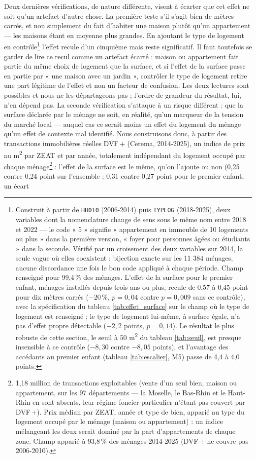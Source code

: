 \documentclass[12pt,a4paper]{article}
\begin{document}
\noindent Deux dernières vérifications, de nature différente, visent à écarter que cet effet ne soit qu'un artefact d'autre chose. La première teste s'il s'agit bien de mètres carrés, et non simplement du fait d'habiter une maison plutôt qu'un appartement — les maisons étant en moyenne plus grandes. En ajoutant le type de logement en contrôle\footnote{Construit à partir de \texttt{HH010} (2006-2014) puis \texttt{TYPLOG} (2018-2025), deux variables dont la nomenclature change de sens sous le même nom entre 2018 et 2022 — le code « 5 » signifie « appartement en immeuble de 10 logements ou plus » dans la première version, « foyer pour personnes âgées ou étudiants » dans la seconde. Vérifié par un croisement des deux variables sur 2014, la seule vague où elles coexistent : bijection exacte sur les 11 384 ménages, aucune discordance une fois le bon code appliqué à chaque période. Champ renseigné pour 99,4\,\% des ménages. L'effet de la surface pour le premier enfant, ménages installés depuis trois ans ou plus, recule de 0,57 à 0,45 point pour dix mètres carrés ($-20$\,\%, $p = 0{,}04$ contre $p = 0{,}009$ sans ce contrôle), avec la spécification du tableau \ref{tab:effet_surface} sur le champ où le type de logement est renseigné ; le type de logement lui-même, à surface égale, n'a pas d'effet propre détectable ($-2{,}2$ points, $p = 0{,}14$). Le résultat le plus robuste de cette section, le seuil à 50 m\textsuperscript{2} du tableau \ref{tab:seuil}, est presque insensible à ce contrôle ($-8{,}30$ contre $-8{,}05$ points), et l'avantage des accédants au premier enfant (tableau \ref{tab:escalier}, M5) passe de 4,4 à 4,0 points.} l'effet recule d'un cinquième mais reste significatif. Il faut toutefois se garder de lire ce recul comme un artefact écarté : maison ou appartement fait partie du même choix de logement que la surface, et si l'effet de la surface passe en partie par « une maison avec un jardin », contrôler le type de logement retire une part légitime de l'effet et non un facteur de confusion. Les deux lectures sont possibles et nous ne les départageons pas ; l'ordre de grandeur du résultat, lui, n'en dépend pas. La seconde vérification s'attaque à un risque différent : que la surface déclarée par le ménage ne soit, en réalité, qu'un marqueur de la tension du marché local — auquel cas ce serait moins un effet du logement du ménage qu'un effet de contexte mal identifié. Nous construisons donc, à partir des transactions immobilières réelles DVF\,+ (Cerema, 2014-2025), un indice de prix au m\textsuperscript{2} par ZEAT et par année, totalement indépendant du logement occupé par chaque ménage\footnote{1,18 million de transactions exploitables (vente d'un seul bien, maison ou appartement, sur les 97 départements — la Moselle, le Bas-Rhin et le Haut-Rhin en sont absents, leur régime foncier particulier n'étant pas couvert par DVF\,+). Prix médian par ZEAT, année et type de bien, apparié au type du logement occupé par le ménage (maison ou appartement) : un indice mélangeant les deux serait dominé par la part d'appartements de chaque zone. Champ apparié à 93,8\,\% des ménages 2014-2025 (DVF\,+ ne couvre pas 2006-2010).} : l'effet de la surface est le même, qu'on l'ajoute ou non (0,25 contre 0,24 point sur l'ensemble ; 0,31 contre 0,27 point pour le premier enfant, un écart 
\end{document}
